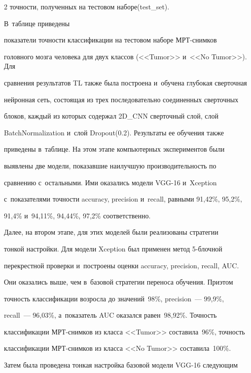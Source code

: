\begin{multicols}{2}
точ\-ности, полученных на тестовом наборе\linebreak (test\_set). 



В~таблице приведены 

показатели точности классификации на тестовом наборе МРТ-сним\-ков 

головного мозга человека для двух классов (<<Tumor>> и~<<No Tumor>>). Для 

сравнения результатов TL также была построена и~обучена глубокая сверточная 

нейронная сеть, состоящая из трех последовательно соединенных сверточных 

блоков, каждый из которых содержал 2D\_CNN сверточный слой, слой 

BatchNormalization и~слой Dropout(0.2). Результаты ее обучения также 

приведены в~таблице. На этом этапе компьютерных экспериментов были 

выявлены две модели, показавшие наилучшую производительность по 

сравнению с~остальными. Ими оказались модели VGG-16 и~Xception 

с~показателями точности accuracy, precision и~recall, равными 91,42\%, 95,2\%, 

91,4\% и~94,11\%, 94,44\%, 97,2\% соответственно.

  

  

  Далее, на втором этапе, для этих моделей были реализованы стратегии 

тонкой настройки. Для модели Xception был применен метод 5-блоч\-ной 

перекрестной проверки и~построены оценки accuracy, precision, recall, AUC. 

Они оказались выше, чем в~базовой стратегии переноса обучения. При\linebreak этом 

точность классификации возросла до значений~98\%, precision~--- 99,9\%, 

recall~--- 96,03\%, а~показатель AUC оказался равен~98,92\%. Точность 

классификации МРТ-сним\-ков из класса <<Tumor>> \mbox{составила}~96\%, точ\-ность 

классификации МРТ-сним\-ков из класса <<No Tumor>> со\-ста\-ви\-ла~100\%.

  

  Затем была проведена тонкая настройка базовой модели VGG-16 следующим 


\end{multicols}
